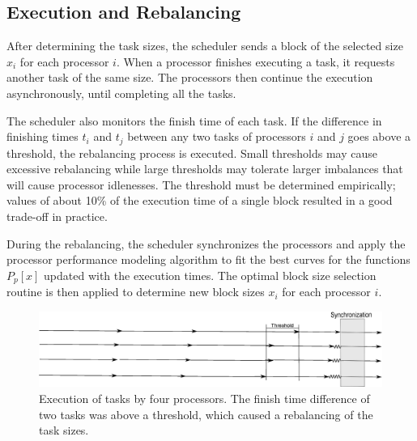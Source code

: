 \documentclass[journal]{IEEEtran}
\begin{document}
\subsection{Execution and Rebalancing}
After determining the task sizes, the scheduler sends a block of the selected
size $x_i$ for each processor $i$. When a processor finishes executing a task,
it requests another task of the same size. The processors then continue the
execution asynchronously, until completing all the tasks.

The scheduler also monitors the finish time of each task. If the difference in
finishing times $t_i$ and $t_j$ between any two tasks of processors $i$ and $j$
goes above a threshold, the rebalancing process is executed. Small thresholds
may cause excessive rebalancing while large thresholds may tolerate larger
imbalances that will cause processor idlenesses. The threshold must be
determined empirically; values of about 10\% of the execution time of a single
block resulted in a good trade-off in practice.


During the rebalancing, the scheduler synchronizes the processors and apply the
processor performance modeling algorithm to fit the best curves for the
functions $P_p[x]$ updated with the execution times. The optimal block size
selection routine is then applied to determine new block sizes $x_i$ for each
processor $i$.

\begin{figure}[!t]
	\centering
			\includegraphics[scale=0.22]{DiagramaArtigo.eps}
	\caption{Execution of tasks by four processors. The finish time
          difference of two tasks was above a threshold, which caused a
          rebalancing of the task sizes.}
	\label{fig:Diagrama}
\end{figure}

\end{document}
